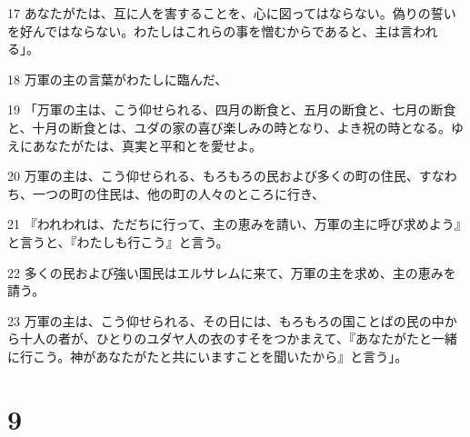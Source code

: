 \par 17 あなたがたは、互に人を害することを、心に図ってはならない。偽りの誓いを好んではならない。わたしはこれらの事を憎むからであると、主は言われる」。
\par 18 万軍の主の言葉がわたしに臨んだ、
\par 19 「万軍の主は、こう仰せられる、四月の断食と、五月の断食と、七月の断食と、十月の断食とは、ユダの家の喜び楽しみの時となり、よき祝の時となる。ゆえにあなたがたは、真実と平和とを愛せよ。
\par 20 万軍の主は、こう仰せられる、もろもろの民および多くの町の住民、すなわち、一つの町の住民は、他の町の人々のところに行き、
\par 21 『われわれは、ただちに行って、主の恵みを請い、万軍の主に呼び求めよう』と言うと、『わたしも行こう』と言う。
\par 22 多くの民および強い国民はエルサレムに来て、万軍の主を求め、主の恵みを請う。
\par 23 万軍の主は、こう仰せられる、その日には、もろもろの国ことばの民の中から十人の者が、ひとりのユダヤ人の衣のすそをつかまえて、『あなたがたと一緒に行こう。神があなたがたと共にいますことを聞いたから』と言う」。

\chapter{9}

